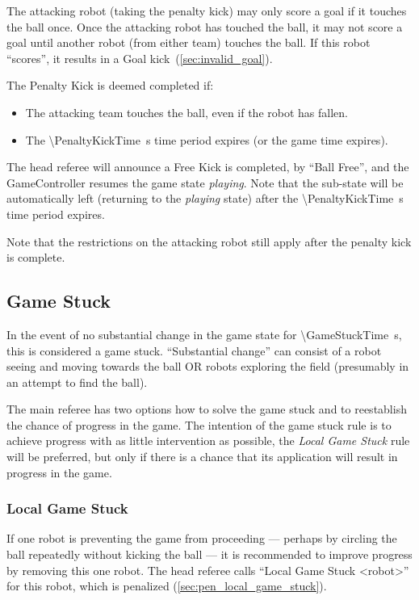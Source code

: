 The attacking robot (taking the penalty kick) may only score a goal if it touches the ball once.
Once the attacking robot has touched the ball, it may not score a goal until another robot (from either team) touches the ball.
If this robot ``scores'', it results in a Goal kick~(\cf \cref{sec:invalid_goal}).

The Penalty Kick is deemed completed if:
\begin{itemize}
\item The attacking team touches the ball, even if the robot has fallen.
\item The \qty{\PenaltyKickTime}{\second} time period expires (or the game time expires).
\end{itemize}

The head referee will announce a Free Kick is completed, by ``Ball Free'', and the GameController
resumes the game state \emph{playing}. Note that the sub-state will be automatically left (returning to the \textit{playing} state) after the \qty{\PenaltyKickTime}{\second} time period expires.

Note that the restrictions on the attacking robot still apply after the penalty kick is complete.

\subsection{Game Stuck}
\label{sec:game_stuck}

In the event of no substantial change in the game state for \qty{\GameStuckTime}{\second}, this is considered a game stuck.  ``Substantial change'' can consist of a robot seeing and moving towards the ball OR robots exploring the field (presumably in an attempt to find the ball).

The main referee has two options how to solve the game stuck and to reestablish the chance of progress in the game. The intention of the game stuck rule is to achieve progress with as little intervention as possible, \ie the \emph{Local Game Stuck} rule will be preferred, but only if there is a chance that its application will result in progress in the game.

\subsubsection{Local Game Stuck}
\label{sec:game_stuck:local}

If one robot is preventing the game from proceeding --- perhaps by circling the ball repeatedly without kicking the ball --- it is recommended to improve progress by removing this one robot.
The head referee calls ``Local Game Stuck \textless robot\textgreater'' for this robot, which is penalized (\cf \cref{sec:pen_local_game_stuck}).

